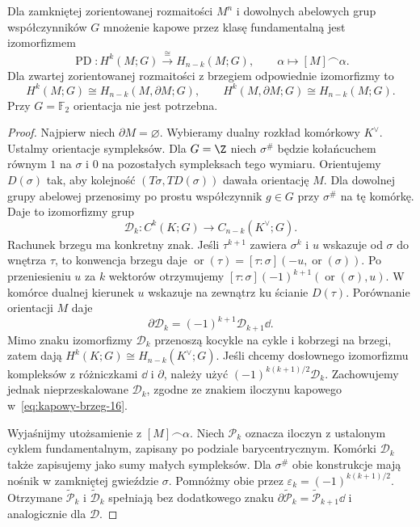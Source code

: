 \begin{twierdzenie}
\label{thm:poincare-dualnosc-16}
Dla zamkniętej zorientowanej
rozmaitości $M^n$ i dowolnych
abelowych grup współczynników $G$ mnożenie
kapowe przez klasę fundamentalną
jest izomorfizmem
\[
 \operatorname{PD}:H^k(M;G)
       \stackrel{\cong}{\longrightarrow}
       H_{n-k}(M;G),\qquad
 \alpha\longmapsto[M]\frown\alpha.
\]
Dla zwartej zorientowanej
rozmaitości z brzegiem
odpowiednie izomorfizmy to
\[
 H^k(M;G)\cong H_{n-k}(M,\partial M;G),
 \qquad
 H^k(M,\partial M;G)\cong H_{n-k}(M;G).
\]
Przy $G=\mathbb F_2$ orientacja
nie jest potrzebna.
\end{twierdzenie}
\begin{proof}
Najpierw niech $\partial M=\varnothing$.
Wybieramy dualny rozkład komórkowy
$K^\vee$. Ustalmy orientacje sympleksów. Dla $G=\Z$ niech
$\sigma^\#$ będzie kołańcuchem równym $1$ na $\sigma$
i $0$ na pozostałych sympleksach tego wymiaru.
Orientujemy $D(\sigma)$ tak, aby kolejność
$(T\sigma,TD(\sigma))$ dawała orientację $M$.
Dla dowolnej grupy abelowej przenosimy po prostu
współczynnik $g\in G$ przy $\sigma^\#$ na tę komórkę.
Daje to izomorfizmy grup
\[
 \mathcal D_k:C^k(K;G)\longrightarrow C_{n-k}(K^\vee;G).
\]
Rachunek brzegu ma konkretny znak. Jeśli $\tau^{k+1}$
zawiera $\sigma^k$ i $u$ wskazuje od $\sigma$ do wnętrza
$\tau$, to konwencja brzegu daje
$\operatorname{or}(\tau)=[\tau:\sigma](-u,\operatorname{or}(\sigma))$.
Po przeniesieniu $u$ za $k$ wektorów otrzymujemy
$[\tau:\sigma](-1)^{k+1}(\operatorname{or}(\sigma),u)$.
W komórce dualnej kierunek $u$ wskazuje na zewnątrz
ku ścianie $D(\tau)$. Porównanie orientacji $M$ daje
\begin{equation}\label{eq:dualny-lancuch-16}
 \partial\mathcal D_k=(-1)^{k+1}\mathcal D_{k+1}\dd.
\end{equation}
Mimo znaku izomorfizmy $\mathcal D_k$ przenoszą
kocykle na cykle i kobrzegi na brzegi, zatem dają
$H^k(K;G)\cong H_{n-k}(K^\vee;G)$.
Jeśli chcemy dosłownego izomorfizmu kompleksów
z różniczkami $\dd$ i $\partial$, należy użyć
$(-1)^{k(k+1)/2}\mathcal D_k$. Zachowujemy jednak
nieprzeskalowane $\mathcal D_k$, zgodne ze znakiem
iloczynu kapowego w~\eqref{eq:kapowy-brzeg-16}.

Wyjaśnijmy utożsamienie z $[M]\frown\alpha$.
Niech $\mathcal P_k$ oznacza iloczyn z ustalonym
cyklem fundamentalnym, zapisany po podziale barycentrycznym.
Komórki $\mathcal D_k$ także zapisujemy jako sumy
małych sympleksów. Dla $\sigma^\#$ obie konstrukcje
mają nośnik w zamkniętej gwieździe $\sigma$.
Pomnóżmy obie przez $\varepsilon_k=(-1)^{k(k+1)/2}$.
Otrzymane $\widetilde{\mathcal P}_k$ i
$\widetilde{\mathcal D}_k$ spełniają bez dodatkowego znaku
$\partial\widetilde{\mathcal P}_k
=\widetilde{\mathcal P}_{k+1}\dd$ i analogicznie dla $\mathcal D$.


\end{proof}
